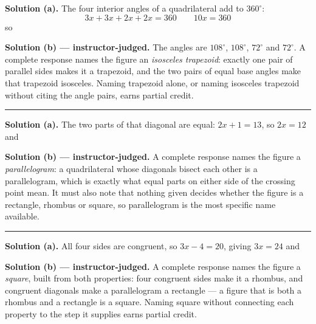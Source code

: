\documentclass[12pt]{article}
\begin{document}




\noindent\textbf{Solution (a).} The four interior angles of a quadrilateral add
to $360^\circ$:
\[ 3x + 3x + 2x + 2x = 360 \qquad 10x = 360 \]
so 

\noindent\textbf{Solution (b) --- instructor-judged.} The angles are $108^\circ$,
$108^\circ$, $72^\circ$ and $72^\circ$. A complete response names the figure an
\emph{isosceles trapezoid}: exactly one pair of parallel sides makes it a
trapezoid, and the two pairs of equal base angles make that trapezoid isosceles.
Naming trapezoid alone, or naming isosceles trapezoid without citing the angle
pairs, earns partial credit.

\vspace{0.15cm}\noindent\rule{\linewidth}{0.2pt}


\noindent\textbf{Solution (a).} The two parts of that diagonal are equal:
$2x + 1 = 13$, so $2x = 12$ and 

\noindent\textbf{Solution (b) --- instructor-judged.} A complete response names
the figure a \emph{parallelogram}: a quadrilateral whose diagonals bisect each
other is a parallelogram, which is exactly what equal parts on either side of the
crossing point mean. It must also note that nothing given decides whether the
figure is a rectangle, rhombus or square, so parallelogram is the most specific
name available.

\vspace{0.15cm}\noindent\rule{\linewidth}{0.2pt}


\noindent\textbf{Solution (a).} All four sides are congruent, so
$3x - 4 = 20$, giving $3x = 24$ and 

\noindent\textbf{Solution (b) --- instructor-judged.} A complete response names
the figure a \emph{square}, built from both properties: four congruent sides make
it a rhombus, and congruent diagonals make a parallelogram a rectangle --- a
figure that is both a rhombus and a rectangle is a square. Naming square without
connecting each property to the step it supplies earns partial credit.
\end{document}
